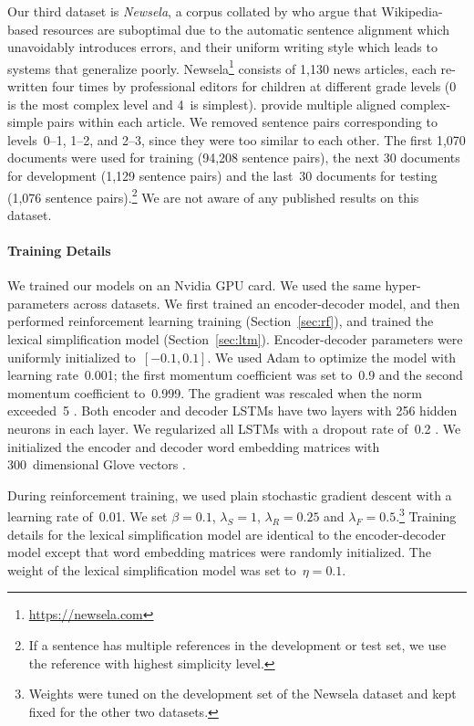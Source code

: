 \documentclass[11pt,letterpaper]{article}
\begin{document}
Our third dataset is \textit{Newsela}, a corpus collated by
 who argue that Wikipedia-based resources
are suboptimal due to the automatic sentence alignment which
unavoidably introduces errors, and their uniform writing style which
leads to systems that generalize poorly.
Newsela\footnote{\url{https://newsela.com}} consists of 1,130 news articles,
each re-written four times by professional editors for children at
different grade levels (0 is the most complex level and 4~is
simplest).  provide multiple aligned
complex-simple pairs within each article.  We removed sentence pairs
corresponding to levels~\mbox{0--1}, \mbox{1--2}, and \mbox{2--3},
since they were too similar to each other. The first 1,070 documents
were used for training (94,208 sentence pairs), the next 30 documents
for development (1,129 sentence pairs) and the last~30 documents for
testing (1,076 sentence pairs).\footnote{If a sentence has multiple
	references in the development or test set, we use the reference with
	highest simplicity level.}  We are not aware of any published
results on this dataset.





\paragraph{Training Details}
We trained our models on an Nvidia GPU card. We used the
same hyper-parameters across datasets.  We first trained an
encoder-decoder model, and then performed reinforcement learning
training (Section~\ref{sec:rf}), and trained the lexical
simplification model (Section~\ref{sec:ltm}).  Encoder-decoder
parameters were uniformly initialized to~$[-0.1, 0.1]$.  We used Adam
\cite{kingma:2014} to optimize the model with learning rate~0.001; the
first momentum coefficient was set to~0.9 and the second momentum
coefficient to~0.999. The gradient was rescaled when the norm
exceeded~5 \cite{pascanu:2013}. Both encoder and decoder LSTMs have
two layers with 256 hidden neurons in each layer. We regularized all
LSTMs with a dropout rate of~0.2
\cite{zaremba:2014}. We initialized the encoder and
decoder word embedding matrices with  300~dimensional Glove
vectors \cite{pennington:2014}.

During reinforcement training, we used plain stochastic gradient
descent with a learning rate of~0.01. We set $\beta = 0.1$,
$\lambda_S = 1$, $\lambda_R = 0.25$ and
$\lambda_F = 0.5$.\footnote{Weights were tuned on the development set
	of the Newsela dataset and kept fixed for the other two datasets.}
Training details for the lexical simplification model are identical to
the encoder-decoder model except that word embedding matrices were
randomly initialized. The weight of the lexical simplification model
was set to~$\eta=0.1$.
\end{document}
